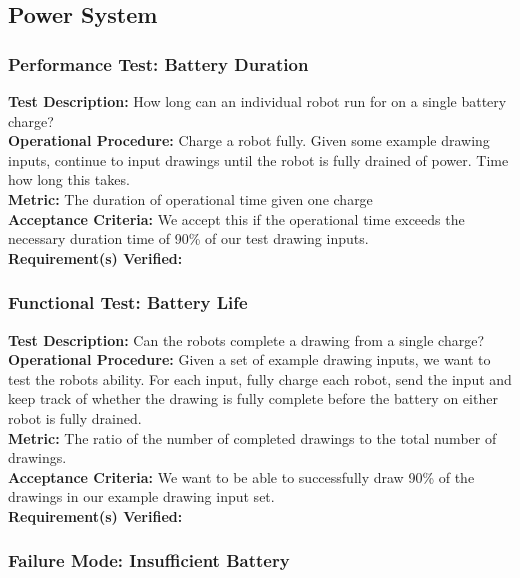 
\subsection{Power System}
\label{sec:verification_power}

\subsubsection{Performance Test: Battery Duration}
\label{sec:power_pt_battery}
\textbf{Test Description:} How long can an individual robot run for on a single battery charge? \\
\textbf{Operational Procedure:} Charge a robot fully. Given some example drawing inputs, continue to input drawings until the robot is fully drained of power. Time how long this takes. \\
\textbf{Metric:} The duration of operational time given one charge \\
\textbf{Acceptance Criteria:} We accept this if the operational time exceeds the necessary duration time of 90\% of our test drawing inputs. \\
\textbf{Requirement(s) Verified:} 

\subsubsection{Functional Test: Battery Life}
\label{sec:power_ft_battery}
\textbf{Test Description:} Can the robots complete a drawing from a single charge? \\
\textbf{Operational Procedure:} Given a set of example drawing inputs, we want to test the robots ability. For each input, fully charge each robot, send the input and keep track of whether the drawing is fully complete before the battery on either robot is fully drained. \\
\textbf{Metric:} The ratio of the number of completed drawings to the total number of drawings. \\
\textbf{Acceptance Criteria:}  We want to be able to successfully draw 90\% of the drawings in our example drawing input set. \\
\textbf{Requirement(s) Verified:} 

\subsubsection{Failure Mode: Insufficient Battery}
\label{sec:power_fm_battery}
